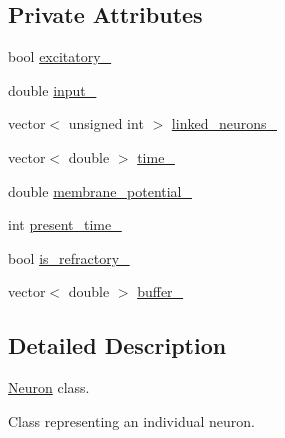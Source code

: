 \subsection*{Private Attributes}
\begin{DoxyCompactItemize}
\item 
bool \hyperlink{classNeuron_a4450ff3bd20d2e5b4f74746068b8d461}{excitatory\-\_\-}
\item 
double \hyperlink{classNeuron_a9ed47eb032d964fdebc77bca888226fa}{input\-\_\-}
\item 
vector$<$ unsigned int $>$ \hyperlink{classNeuron_a71f410f0b2026456ab554bfb6f1b4b9e}{linked\-\_\-neurons\-\_\-}
\item 
vector$<$ double $>$ \hyperlink{classNeuron_a7674c161dce2a7990b2ae2ebaa638ff6}{time\-\_\-}
\item 
double \hyperlink{classNeuron_a58829bf280bb52776e8842c71a92af4a}{membrane\-\_\-potential\-\_\-}
\item 
int \hyperlink{classNeuron_a548aa19e97c22a209419f8e14aaf0d72}{present\-\_\-time\-\_\-}
\item 
bool \hyperlink{classNeuron_a16f9f6f89c1bc27ca4f2cfa868c640d5}{is\-\_\-refractory\-\_\-}
\item 
vector$<$ double $>$ \hyperlink{classNeuron_ab2abc06234893064464b0c5ac4374ada}{buffer\-\_\-}
\end{DoxyCompactItemize}


\subsection{Detailed Description}
\hyperlink{classNeuron}{Neuron} class. 

Class representing an individual neuron. 

